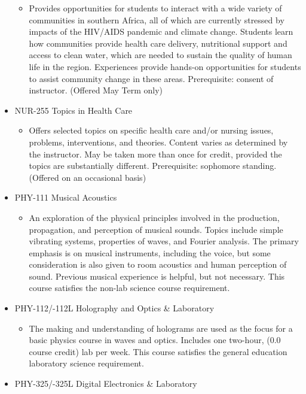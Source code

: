 \documentclass[
  letterpaper,
]{scrbook}
\providecommand{\tightlist}{%
  \setlength{\itemsep}{0pt}\setlength{\parskip}{0pt}}
\begin{document}
\begin{itemize}
  \begin{itemize}
  \tightlist
  \item
    Provides opportunities for students to interact with a wide variety
    of communities in southern Africa, all of which are currently
    stressed by impacts of the HIV/AIDS pandemic and climate change.
    Students learn how communities provide health care delivery,
    nutritional support and access to clean water, which are needed to
    sustain the quality of human life in the region. Experiences provide
    hands-on opportunities for students to assist community change in
    these areas. Prerequisite: consent of instructor. (Offered May Term
    only)
  \end{itemize}
\item
  NUR-255 Topics in Health Care

  \begin{itemize}
  \tightlist
  \item
    Offers selected topics on specific health care and/or nursing
    issues, problems, interventions, and theories. Content varies as
    determined by the instructor. May be taken more than once for
    credit, provided the topics are substantially different.
    Prerequisite: sophomore standing. (Offered on an occasional basis)
  \end{itemize}
\item
  PHY-111 Musical Acoustics

  \begin{itemize}
  \tightlist
  \item
    An exploration of the physical principles involved in the
    production, propagation, and perception of musical sounds. Topics
    include simple vibrating systems, properties of waves, and Fourier
    analysis. The primary emphasis is on musical instruments, including
    the voice, but some consideration is also given to room acoustics
    and human perception of sound. Previous musical experience is
    helpful, but not necessary. This course satisfies the non-lab
    science course requirement.\\
  \end{itemize}
\item
  PHY-112/-112L Holography and Optics \& Laboratory

  \begin{itemize}
  \tightlist
  \item
    The making and understanding of holograms are used as the focus for
    a basic physics course in waves and optics. Includes one two-hour,
    (0.0 course credit) lab per week. This course satisfies the general
    education laboratory science requirement.
  \end{itemize}
\item
  PHY-325/-325L Digital Electronics \& Laboratory


\end{itemize}
\end{document}
